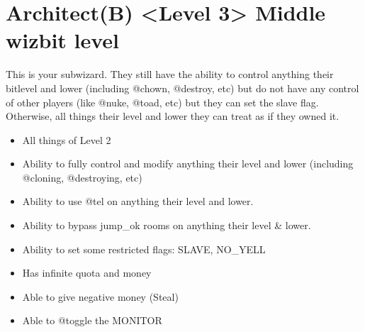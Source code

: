 \documentclass[letterpaper,10pt,english]{sphinxmanual}
\begin{document}
\section{Architect(B) \textless{}Level 3\textgreater{} \sphinxhyphen{} Middle wizbit level}
\label{\detokenize{bitlevels:architect-b-level-3-middle-wizbit-level}}
\sphinxAtStartPar
This is your sub\sphinxhyphen{}wizard.  They still have the ability to control
anything their bitlevel and lower (including @chown, @destroy, etc)
but do not have any control of other players (like @nuke, @toad, etc)
but they can set the slave flag.  Otherwise, all things their level
and lower they can treat as if they owned it.
\begin{itemize}
\item {} 
\sphinxAtStartPar
All things of Level 2

\item {} 
\sphinxAtStartPar
Ability to fully control and modify anything their level and lower (including @cloning, @destroying, etc)

\item {} 
\sphinxAtStartPar
Ability to use @tel on anything their level and lower.

\item {} 
\sphinxAtStartPar
Ability to bypass jump\_ok rooms on anything their level \& lower.

\item {} 
\sphinxAtStartPar
Ability to set some restricted flags: SLAVE, NO\_YELL

\item {} 
\sphinxAtStartPar
Has infinite quota and money

\item {} 
\sphinxAtStartPar
Able to give negative money (Steal)

\item {} 
\sphinxAtStartPar
Able to @toggle the MONITOR

\end{itemize}
\end{document}
